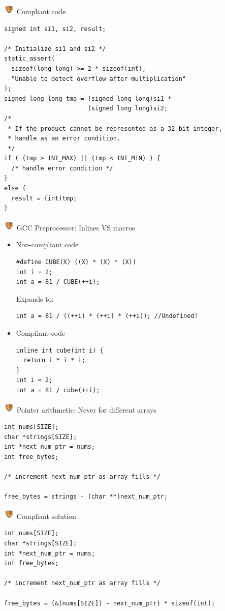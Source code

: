 \documentclass{beamer}
\newcommand{\shield}{\includegraphics[width=15pt]{shield.png} \hspace*{5pt}}
\begin{document}
\begin{frame}[fragile]{\shield Compliant code}
\begin{lstlisting}[style=cstyle]
signed int si1, si2, result;

/* Initialize si1 and si2 */
static_assert(
  sizeof(long long) >= 2 * sizeof(int),
  "Unable to detect overflow after multiplication"
);
signed long long tmp = (signed long long)si1 *
                       (signed long long)si2;
/*
 * If the product cannot be represented as a 32-bit integer,
 * handle as an error condition.
 */
if ( (tmp > INT_MAX) || (tmp < INT_MIN) ) {
  /* handle error condition */
}
else {
  result = (int)tmp;
}
\end{lstlisting}
\end{frame}

\begin{frame}[fragile]{\shield GCC Preprocessor: Inlines VS macros}
\begin{itemize}
\item Non-compliant code
  \begin{lstlisting}[style=cstyle]
#define CUBE(X) ((X) * (X) * (X))
int i = 2;
int a = 81 / CUBE(++i);
  \end{lstlisting}
\pause
Expands to: 
\begin{lstlisting}[style=cstyle]
int a = 81 / ((++i) * (++i) * (++i)); //Undefined!
\end{lstlisting}
\pause
\item Compliant code
\begin{lstlisting}[style=cstyle]
inline int cube(int i) {
  return i * i * i;
}
int i = 2;
int a = 81 / cube(++i);
\end{lstlisting}
\end{itemize}
\end{frame}
\begin{frame}[fragile]{\shield Pointer arithmetic: Never for different arrays}
  \begin{lstlisting}[style=cstyle]
int nums[SIZE];
char *strings[SIZE];
int *next_num_ptr = nums;
int free_bytes;
 
/* increment next_num_ptr as array fills */
 
free_bytes = strings - (char **)next_num_ptr;

  \end{lstlisting}
\end{frame}
\begin{frame}[fragile]{\shield Compliant solution}
  \begin{lstlisting}[style=cstyle]
int nums[SIZE];
char *strings[SIZE];
int *next_num_ptr = nums;
int free_bytes;
 
/* increment next_num_ptr as array fills */
 
free_bytes = (&(nums[SIZE]) - next_num_ptr) * sizeof(int);
  \end{lstlisting}
\end{frame}
\end{document}
